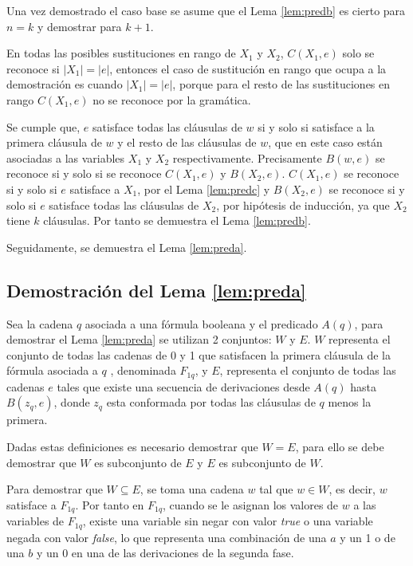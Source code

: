 \documentclass[12pt]{article}
\newcommand{\true}{\textit{true}}
\newcommand{\false}{\textit{false}}
\begin{document}
Una vez demostrado el caso base se asume que el Lema \ref{lem:predb} es cierto para $n=k$ y demostrar para $k+1$.

En todas las posibles sustituciones en rango de $X_1$ y $X_2$, $C(X_1,e)$ solo se reconoce si $|X_1|=|e|$, 
entonces el caso de sustitución en rango que ocupa a la demostración es cuando $|X_1|=|e|$, porque para el 
resto de las sustituciones en rango $C(X_1,e)$ no se reconoce por la gramática.  

Se cumple que, $e$ satisface 
todas las cláusulas de $w$ si y solo si satisface a la primera cláusula de $w$ y el resto de las cláusulas de 
$w$, que en este caso están asociadas a las variables $X_1$ y $X_2$ respectivamente. 
Precisamente $B(w,e)$ se reconoce si y solo si se reconoce $C(X_1,e)$ y $B(X_2,e)$. 
$C(X_1,e)$ se reconoce si y solo si $e$ satisface a $X_1$, por el Lema \ref{lem:predc} y $B(X_2,e)$ se reconoce si 
y solo si $e$ satisface todas las cláusulas de $X_2$, por hipótesis de inducción, ya que $X_2$ tiene $k$
cláusulas. Por tanto se demuestra el Lema \ref{lem:predb}.

Seguidamente, se demuestra el Lema \ref{lem:preda}.

\subsection{Demostración del Lema \ref{lem:preda}}

Sea la cadena $q$ asociada a una fórmula booleana y el predicado $A(q)$, para demostrar el Lema \ref{lem:preda} se utilizan 2 conjuntos: $W$ y $E$. $W$ representa el conjunto de todas las cadenas de 0 y 1 que satisfacen la primera cláusula de la fórmula asociada a $q$ , denominada $F_{1q}$, y $E$, representa el conjunto de todas las cadenas $e$ tales que existe una secuencia de derivaciones desde $A(q)$ hasta $B(z_q,e)$, donde $z_q$ esta conformada por todas las cláusulas de $q$ menos la primera.

Dadas estas definiciones es necesario demostrar que $W=E$, para ello se debe demostrar que $W$ es subconjunto de $E$ y $E$ es subconjunto de $W$. 

Para demostrar que $W\subseteq E$, se toma una cadena $w$ tal que $w\in W$, es decir, $w$ satisface a $F_{1q}$. 
Por tanto en $F_{1q}$, cuando se le asignan los valores de $w$ a las variables de $F_{1q}$, existe una variable 
sin negar con valor \true{} o una variable negada con valor \false{}, lo que representa una combinación de una $a$ y un 1 o de una $b$ y un 0 en una de las derivaciones de la segunda fase.
\end{document}
